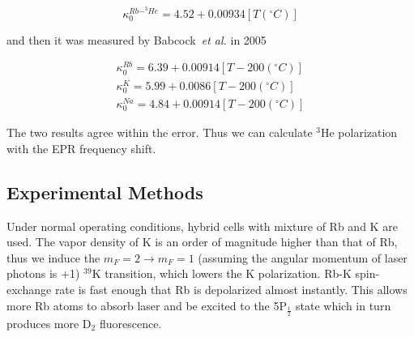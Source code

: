 \begin{equation}
\kappa_{0}^{Rb-^{3}He}=4.52+0.00934[T(^{\circ}C)]
\end{equation}

and then it was measured by Babcock~\emph{et al.} in 2005

\begin{subequations}
	\begin{gather}
	\kappa_{0}^{Rb}=6.39+0.00914[T-200(^{\circ}C)]\\
	\kappa_{0}^{K}=5.99+0.0086[T-200(^{\circ}C)]\\
	\kappa_{0}^{Na}=4.84+0.00914[T-200(^{\circ}C)]
	\end{gather}
\end{subequations}

The two results agree within the error. Thus we can calculate $^{3}$He polarization with the EPR frequency shift. 

\subsection{Experimental Methods}

Under normal operating conditions, hybrid cells with mixture of Rb and K are used. The vapor density of K is an order of magnitude higher than that of Rb, thus we induce the $m_{F} = 2 \rightarrow m_{F} = 1$ (assuming the angular momentum of laser photons is +1) $^{39}$K transition, which lowers the K polarization. Rb-K spin-exchange rate is fast enough that Rb is depolarized almost instantly. This allows more Rb atoms to absorb laser and be excited to the 5P$_{\frac{1}{2}}$ state which in turn produces more D$_{2}$ fluorescence.




















